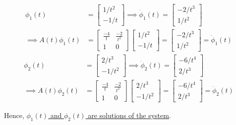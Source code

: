 \begin{align*}
    \phi_1(t)
     & =
    \begin{bmatrix}
        1/t^2 \\
        -1/t
    \end{bmatrix}
    \implies
    \dot \phi_1(t)
    =
    \begin{bmatrix}
        -2/t^3 \\
        1/t^2
    \end{bmatrix}
    \\
    \implies
    A(t)\phi_1(t)
     & =
    \begin{bmatrix}
        \frac{-4}{t} & \frac{-2}{t^2} \\
        1            & 0
    \end{bmatrix}
    \begin{bmatrix}
        1/t^2 \\
        -1/t
    \end{bmatrix}
    =
    \begin{bmatrix}
        -2/t^3 \\
        1/t^2
    \end{bmatrix}
    =
    \dot \phi_1(t)
\end{align*}
\begin{align*}
    \phi_2(t)
     & =
    \begin{bmatrix}
        2/t^3 \\
        -1/t^2
    \end{bmatrix}
    \implies
    \dot \phi_2(t)
    =
    \begin{bmatrix}
        -6/t^4 \\
        2/t^3
    \end{bmatrix}
    \\
    \implies
    A(t)\phi_2(t)
     & =
    \begin{bmatrix}
        \frac{-4}{t} & \frac{-2}{t^2} \\
        1            & 0
    \end{bmatrix}
    \begin{bmatrix}
        2/t^3 \\
        -1/t^2
    \end{bmatrix}
    =
    \begin{bmatrix}
        -6/t^4 \\
        2/t^3
    \end{bmatrix}
    =
    \dot \phi_2(t)
\end{align*}

Hence, \underline{\( \phi_1(t) \) and \( \phi_2(t) \) are solutions of the system}.
